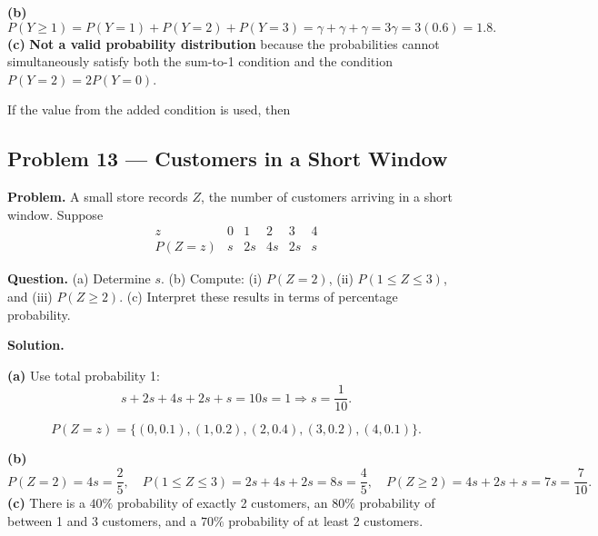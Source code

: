 \begin{ExamProblems}
		

		\textbf{(b)}
		\[
		P(Y\ge 1)=P(Y=1)+P(Y=2)+P(Y=3)=\gamma+\gamma+\gamma=3\gamma=3(0.6)=1.8.
		\]
		\textbf{(c)} \textbf{Not a valid probability distribution} because the probabilities cannot simultaneously satisfy both the sum-to-1 condition and the condition $P(Y=2)=2P(Y=0)$.
		
		If the value from the added condition is used, then

		
		
		\item
		\subsection*{Problem 13 — Customers in a Short Window}
		
		\textbf{Problem.}
		A small store records $Z$, the number of customers arriving in a short window. Suppose
		\[
		\begin{array}{c|ccccc}
			z & 0 & 1 & 2 & 3 & 4\\
			\hline
			P(Z=z) & s & 2s & 4s & 2s & s
		\end{array}
		\]
		
		\textbf{Question.}
		(a) Determine $s$.
		(b) Compute: (i) $P(Z=2)$, (ii) $P(1\le Z\le 3)$, and (iii) $P(Z\ge 2)$.
		(c) Interpret these results in terms of percentage probability.
		
		\textbf{Solution.}

		\textbf{(a)} Use total probability 1:
		\[
		s+2s+4s+2s+s=10s=1\Rightarrow s=\frac{1}{10}.
		\]

		
\[
		P(Z=z)=\{(0,0.1),(1,0.2),(2,0.4),(3,0.2),(4,0.1)\}.
		\]
\begin{center}
		\end{center}
\textbf{(b)}
		\[
		P(Z=2)=4s=\frac{2}{5},\quad
		P(1\le Z\le 3)=2s+4s+2s=8s=\frac{4}{5},\quad
		P(Z\ge 2)=4s+2s+s=7s=\frac{7}{10}.
		\]
		\textbf{(c)} There is a $40\%$ probability of exactly 2 customers, an $80\%$ probability of between 1 and 3 customers, and a $70\%$ probability of at least 2 customers.
		

\end{ExamProblems}
